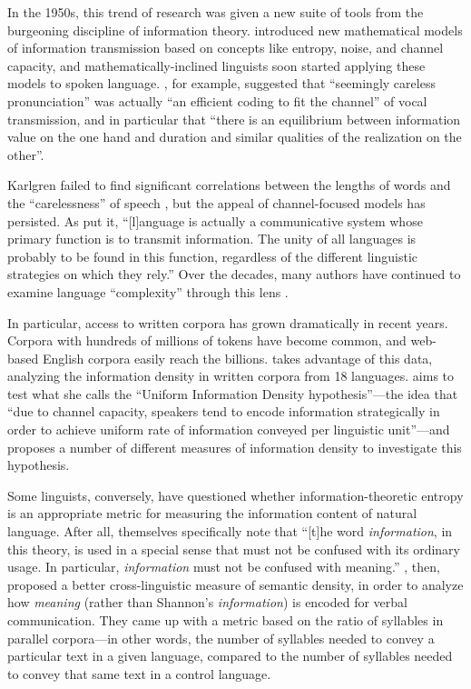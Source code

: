 \documentclass[12pt,twoside]{article}
\begin{document}
In the 1950s, this trend of research was given a new suite of tools from the burgeoning discipline of information theory. \citet{shannon} introduced new mathematical models of information transmission based on concepts like entropy, noise, and channel capacity, and mathematically-inclined linguists soon started applying these models to spoken language. \citet[674,676]{karlgren}, for example, suggested that ``seemingly careless pronunciation'' was actually ``an efficient coding to fit the channel'' of vocal transmission, and in particular that ``there is an equilibrium between information value on the one hand and duration and similar qualities of the realization on the other''.

Karlgren failed to find significant correlations between the lengths of words and the ``carelessness'' of speech \citep{karlgren}, but the appeal of channel-focused models has persisted. As \citet[539]{pellegrino} put it, ``[l]anguage is actually a communicative system whose primary function is to transmit information. The unity of all languages is probably to be found in this function, regardless of the different linguistic strategies on which they rely.'' Over the decades, many authors have continued to examine language ``complexity'' through this lens \citep{pellegrino,oh,coupé}.

In particular, access to written corpora has grown dramatically in recent years. Corpora with hundreds of millions of tokens have become common, and web-based English corpora easily reach the billions. \citet{oh} takes advantage of this data, analyzing the information density in written corpora from 18 languages. \citeauthor{oh} aims to test what she calls the ``Uniform Information Density hypothesis''---the idea that ``due to channel capacity, speakers tend to encode information strategically in order to achieve uniform rate of information conveyed per linguistic unit''---and proposes a number of different measures of information density to investigate this hypothesis.

Some linguists, conversely, have questioned whether information-theoretic entropy is an appropriate metric for measuring the information content of natural language. After all, \citet[8]{shannon} themselves specifically note that ``[t]he word \emph{information}, in this theory, is used in a special sense that must not be confused with its ordinary usage. In particular, \emph{information} must not be confused with meaning.'' \citet{pellegrino}, then, proposed a better cross-linguistic measure of semantic density, in order to analyze how \emph{meaning} (rather than Shannon's \emph{information}) is encoded for verbal communication. They came up with a metric based on the ratio of syllables in parallel corpora---in other words, the number of syllables needed to convey a particular text in a given language, compared to the number of syllables needed to convey that same text in a control language.
\end{document}
